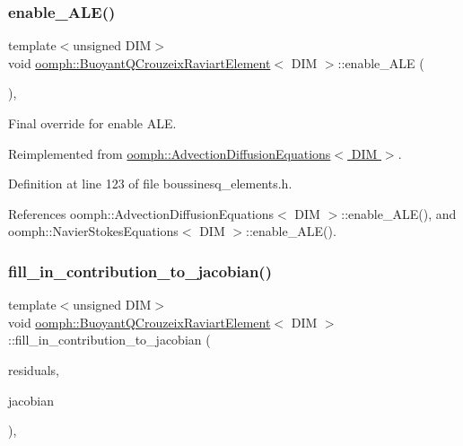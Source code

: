 \subsubsection{\texorpdfstring{enable\+\_\+\+A\+L\+E()}{enable\_ALE()}}
{\footnotesize\ttfamily template$<$unsigned D\+IM$>$ \\
void \hyperlink{classoomph_1_1BuoyantQCrouzeixRaviartElement}{oomph\+::\+Buoyant\+Q\+Crouzeix\+Raviart\+Element}$<$ D\+IM $>$\+::enable\+\_\+\+A\+LE (\begin{DoxyParamCaption}{ }\end{DoxyParamCaption})\hspace{0.3cm}{\ttfamily [inline]}, {\ttfamily [virtual]}}



Final override for enable A\+LE. 



Reimplemented from \hyperlink{classoomph_1_1AdvectionDiffusionEquations_a949dd5a3eb9803c993c1f4506cfd5d82}{oomph\+::\+Advection\+Diffusion\+Equations$<$ D\+I\+M $>$}.



Definition at line 123 of file boussinesq\+\_\+elements.\+h.



References oomph\+::\+Advection\+Diffusion\+Equations$<$ D\+I\+M $>$\+::enable\+\_\+\+A\+L\+E(), and oomph\+::\+Navier\+Stokes\+Equations$<$ D\+I\+M $>$\+::enable\+\_\+\+A\+L\+E().

\mbox{\label{classoomph_1_1BuoyantQCrouzeixRaviartElement_a7bd9313dd697c1219cee4a65692388b5}} 
\subsubsection{\texorpdfstring{fill\+\_\+in\+\_\+contribution\+\_\+to\+\_\+jacobian()}{fill\_in\_contribution\_to\_jacobian()}\hspace{0.1cm}{\footnotesize\ttfamily [1/3]}}
{\footnotesize\ttfamily template$<$unsigned D\+IM$>$ \\
void \hyperlink{classoomph_1_1BuoyantQCrouzeixRaviartElement}{oomph\+::\+Buoyant\+Q\+Crouzeix\+Raviart\+Element}$<$ D\+IM $>$\+::fill\+\_\+in\+\_\+contribution\+\_\+to\+\_\+jacobian (\begin{DoxyParamCaption}\item[{\hyperlink{classoomph_1_1Vector}{Vector}$<$ double $>$ \&}]{residuals,  }\item[{\hyperlink{classoomph_1_1DenseMatrix}{Dense\+Matrix}$<$ double $>$ \&}]{jacobian }\end{DoxyParamCaption})\hspace{0.3cm}{\ttfamily [inline]}, {\ttfamily [virtual]}}



